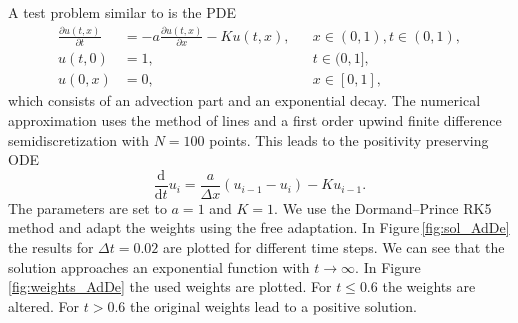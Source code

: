 \documentclass[a4paper]{article}
\numberwithin{equation}{section}
\theoremstyle{plain}
\theoremstyle{definition}
\numberwithin{theorem}{section}
\newcommand{\1}{\mathbbm{1}}
\begin{document}
A test problem similar to \cite{shampine_non-negative_2005} is the PDE
\begin{equation}
\begin{aligned}
  \frac{\partial u(t,x)}{\partial t}
  &=
  -a \frac{\partial u(t,x)}{\partial x} - K u(t,x),
  && x \in (0, 1), t \in (0,1),
  \\
  u(t,0) &= 1,
  && t \in (0,1],
  \\
  u(0,x) &= 0,
  && x \in [0,1],
\end{aligned}
\end{equation}
which consists of an advection part and an exponential decay.
The numerical approximation uses the method of lines and a first order
upwind finite difference semidiscretization with $N = 100$ points.
This leads to the positivity preserving ODE
\begin{equation}
\frac{\mathrm d}{\mathrm d t} u_i = \frac{a}{\Delta x} \left( u_{i-1} - u_i \right) - K u_{i-1}.
\end{equation}
The parameters are set to $a=1$ and $K=1$.
We use the Dormand--Prince RK5 method and adapt the weights using the free adaptation.
In Figure\,\ref{fig:sol_AdDe} the results for $\Delta t = 0.02$ are plotted for different time steps. We can see that the solution approaches an exponential function with $t \rightarrow \infty$.
In Figure\,\ref{fig:weights_AdDe} the used weights are plotted. For $t\leq 0.6$ the weights are altered. For $t > 0.6$ the original weights lead to a positive solution.
\end{document}
